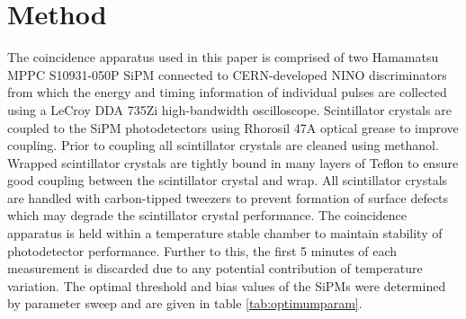 \section{Method}
The coincidence apparatus used in this paper is comprised of two Hamamatsu MPPC S10931-050P SiPM connected to CERN-developed NINO discriminators from which the energy and timing information of individual pulses are collected using a LeCroy DDA 735Zi high-bandwidth oscilloscope. Scintillator crystals are coupled to the SiPM photodetectors using Rhorosil 47A optical grease to improve coupling. Prior to coupling all scintillator crystals are cleaned using methanol. Wrapped scintillator crystals are tightly bound in many layers of Teflon to ensure good coupling between the scintillator crystal and wrap. All scintillator crystals are handled with carbon-tipped tweezers to prevent formation of surface defects which may degrade the scintillator crystal performance. The coincidence apparatus is held within a temperature stable chamber to maintain stability of photodetector performance. Further to this, the first 5 minutes of each measurement is discarded due to any potential contribution of temperature variation. The optimal threshold and bias values of the SiPMs were determined by parameter sweep and are given in table \ref{tab:optimumparam}.


